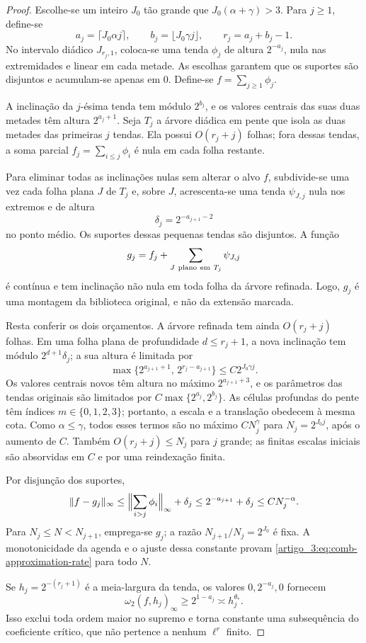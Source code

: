 \documentclass[12pt,a4paper]{article}
\theoremstyle{preciso}
\theoremstyle{definition}
\theoremstyle{preciso}
\theoremstyle{preciso}
\theoremstyle{preciso}
\theoremstyle{preciso}
\theoremstyle{definition}
\theoremstyle{preciso}
\theoremstyle{definition}
\theoremstyle{preciso}
\theoremstyle{preciso}
\theoremstyle{definition}
\begin{document}
\begin{proof}
Escolhe-se um inteiro $J_0$ tão grande que
$J_0(\alpha+\gamma)>3$. Para $j\ge1$, define-se
\[
 a_j=\lceil J_0\alpha j\rceil,
 \qquad b_j=\lfloor J_0\gamma j\rfloor,
 \qquad r_j=a_j+b_j-1.
\]
No intervalo diádico $J_{r_j,1}$, coloca-se uma tenda $\phi_j$ de altura
$2^{-a_j}$, nula nas extremidades e linear em cada metade. As escolhas
garantem que os suportes são disjuntos e acumulam-se apenas em $0$. Define-se
$f=\sum_{j\ge1}\phi_j$.

A inclinação da $j$-ésima tenda tem módulo $2^{b_j}$, e os valores centrais das
suas duas metades têm altura $2^{a_j+1}$. Seja $T_j$ a árvore diádica em pente
que isola as duas metades das primeiras $j$ tendas. Ela possui
$O(r_j+j)$ folhas; fora dessas tendas, a soma parcial
$f_j=\sum_{i\le j}\phi_i$ é nula em cada folha restante.

Para eliminar todas as inclinações nulas sem alterar o alvo $f$, subdivide-se uma
vez cada folha plana $J$ de $T_j$ e, sobre $J$, acrescenta-se uma tenda
$\psi_{J,j}$ nula nos extremos e de altura
\[
 \delta_j=2^{-a_{j+1}-2}
\]
no ponto médio. Os suportes dessas pequenas tendas são disjuntos. A função
\[
 g_j=f_j+\sum_{J\ {\rm plano\ em}\ T_j}\psi_{J,j}
\]
é contínua e tem inclinação não nula em toda folha da árvore refinada. Logo,
$g_j$ é uma montagem da biblioteca original, e não da extensão marcada.

Resta conferir os dois orçamentos. A árvore refinada tem ainda
$O(r_j+j)$ folhas. Em uma folha plana de profundidade $d\le r_j+1$, a nova
inclinação tem módulo $2^{d+1}\delta_j$; a sua altura é limitada por
\[
 \max\{2^{a_{j+1}+1},\,2^{r_j-a_{j+1}}\}
 \le C2^{J_0\gamma j}.
\]
Os valores centrais novos têm altura no máximo $2^{a_{j+1}+3}$, e os
parâmetros das tendas originais são limitados por
$C\max\{2^{a_j},2^{b_j}\}$. As células profundas do pente têm índices
$m\in\{0,1,2,3\}$; portanto, a escala e a translação obedecem à mesma cota.
Como $\alpha\le\gamma$, todos esses termos são no máximo
$CN_j^\gamma$ para $N_j=2^{J_0j}$, após o aumento de $C$. Também
$O(r_j+j)\le N_j$ para $j$ grande; as finitas escalas iniciais são
absorvidas em $C$ e por uma reindexação finita.

Por disjunção dos suportes,
\[
 \|f-g_j\|_\infty
 \le \Bigl\|\sum_{i>j}\phi_i\Bigr\|_\infty+\delta_j
 \le 2^{-a_{j+1}}+\delta_j
 \le C N_j^{-\alpha}.
\]
Para $N_j\le N<N_{j+1}$, emprega-se $g_j$; a razão
$N_{j+1}/N_j=2^{J_0}$ é fixa. A monotonicidade da agenda e o ajuste dessa
constante provam \eqref{artigo_3:eq:comb-approximation-rate} para todo $N$.

Se $h_j=2^{-(r_j+1)}$ é a meia-largura da tenda, os valores
$0,2^{-a_j},0$ fornecem
\[
 \omega_2(f,h_j)_\infty\ge2^{1-a_j}\asymp h_j^{\theta_*}.
\]
Isso exclui toda ordem maior no supremo e torna constante uma subsequência do
coeficiente crítico, que não pertence a nenhum $\ell^r$ finito.
\end{proof}
\end{document}
